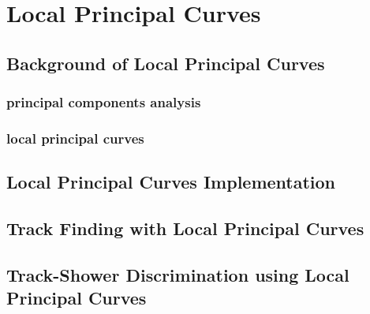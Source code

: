 \chapter{Local Principal Curves}

\section{Background of Local Principal Curves} 
\subsection{principal components analysis}
\subsection{local principal curves}

\section{Local Principal Curves Implementation}

\section{Track Finding with Local Principal Curves}

\section{Track-Shower Discrimination using Local Principal Curves}
